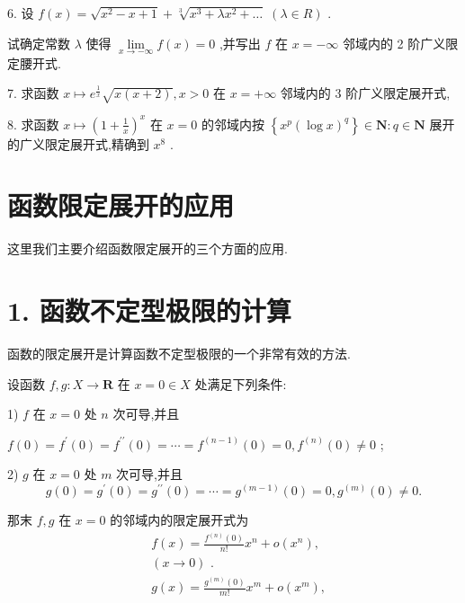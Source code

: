 6. 设 $f\left( x\right)  = \sqrt{{x}^{2} - x + 1} + \sqrt[3]{{x}^{3} + \lambda {x}^{2} + \ldots }\;\left( {\lambda  \in  R}\right)$ .

试确定常数 $\lambda$ 使得 $\mathop{\lim }\limits_{{x \rightarrow   - \infty }}f\left( x\right)  = 0$ ,并写出 $f$ 在 $x =  - \infty$ 邻域内的 2 阶广义限定腰开式.

7. 求函数 $x \mapsto  {e}^{\frac{1}{x}}\sqrt{x\left( {x + 2}\right) },x > 0$ 在 $x =  + \infty$ 邻域内的 3 阶广义限定展开式,

8. 求函数 $x \mapsto  {\left( 1 + \frac{1}{x}\right) }^{x}$ 在 $x = 0$ 的邻域内按 $\left\{  {{x}^{p}{\left( \log x\right) }^{q}}\right\}   \in  \mathbf{N} : q \in  \mathbf{N}$ 展开的广义限定展开式,精确到 ${x}^{8}$ .

\section{函数限定展开的应用}

这里我们主要介绍函数限定展开的三个方面的应用.

\section*{1. 函数不定型极限的计算}

函数的限定展开是计算函数不定型极限的一个非常有效的方法.

设函数 $f,g : X \rightarrow  \mathbf{R}$ 在 $x = 0 \in  X$ 处满足下列条件:

1) $f$ 在 $x = 0$ 处 $n$ 次可导,并且

$f\left( 0\right)  = {f}^{\prime }\left( 0\right)  = {f}^{\prime \prime }\left( 0\right)  = \cdots  = {f}^{\left( n - 1\right) }\left( 0\right)  = 0,{f}^{\left( n\right) }\left( 0\right)  \neq  0$ ;

2) $g$ 在 $x = 0$ 处 $m$ 次可导,并且
$$g\left( 0\right)  = {g}^{\prime }\left( 0\right)  = {g}^{\prime \prime }\left( 0\right)  = \cdots  = {g}^{\left( m - 1\right) }\left( 0\right)  = 0,{g}^{\left( m\right) }\left( 0\right)  \neq  0.$$

那末 $f,g$ 在 $x = 0$ 的邻域内的限定展开式为
\begin{align*}
	&f\left( x\right)  = \frac{{f}^{\left( n\right) }\left( 0\right) }{n!}{x}^{n} + o\left( {x}^{n}\right) ,\\
	&\left( {x \rightarrow  0}\right) \text{ . }\\
	&g\left( x\right)  = \frac{{g}^{\left( m\right) }\left( 0\right) }{m!}{x}^{m} + o\left( {x}^{m}\right) ,
\end{align*}

